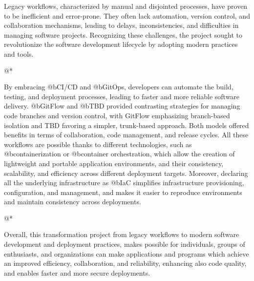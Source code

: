 Legacy workflows, characterized by manual and disjointed processes, have proven to be inefficient and error-prone. They often lack automation, version control, and collaboration mechanisms, leading to delays, inconsistencies, and difficulties in managing software projects. Recognizing these challenges, the project sought to revolutionize the software development lifecycle by adopting modern practices and tools.

@*

By embracing @b{CI/CD} and @b{GitOps}, developers can automate the build, testing, and deployment processes, leading to faster and more reliable software delivery. @b{GitFlow} and @b{TBD} provided contrasting strategies for managing code branches and version control, with GitFlow emphasizing branch-based isolation and TBD favoring a simpler, trunk-based approach. Both models offered benefits in terms of collaboration, code management, and release cycles. All these workflows are possible thanks to different technologies, such as @b{containerization} or @b{container orchestration}, which allow the creation of lightweight and portable application environments, and their consistency, scalability, and efficiency across different deployment targets. Moreover, declaring all the underlying infrastructure as @b{IaC} simplifies infrastructure provisioning, configuration, and management, and makes it easier to reproduce environments and maintain consistency across deployments.

@*

Overall, this transformation project from legacy workflows to modern software development and deployment practices, makes possible for individuals, groups of enthusiasts, and organizations can make applications and programs which achieve an improved efficiency, collaboration, and reliability, enhancing also code quality, and enables faster and more secure deployments.
